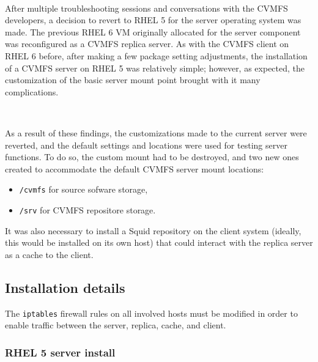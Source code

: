 \documentclass{article}
\begin{document}
~

After multiple troubleshooting sessions and conversations with the CVMFS developers, 
a decision to revert to RHEL 5 for the server operating system was made.  
The previous RHEL 6 VM originally allocated for the server component was reconfigured as a CVMFS replica server.  
As with the CVMFS client on RHEL 6 before, after making a few package setting adjustments, 
the installation of a CVMFS server on RHEL 5 was relatively simple; 
however, as expected, the customization of the basic server mount point brought with it many complications.  

~

As a result of these findings, 
the customizations made to the current server were reverted, 
and the default settings and locations were used for testing server functions.  
To do so, the custom mount had to be destroyed, 
and two new ones created to accommodate the default CVMFS server mount locations:

\begin{itemize}
    \item \verb+/cvmfs+ for source sofware storage,
    \item \verb+/srv+ for CVMFS repositore storage.
\end{itemize}

It was also necessary to install a Squid repository on the client system 
(ideally, this would be installed on its own host) 
that could interact with the replica server as a cache to the client.

\subsection{Installation details}

The \verb+iptables+ firewall rules on all involved hosts must be
modified in order to enable traffic between the server, replica, cache, and client.  

\subsubsection{RHEL 5 server install}
\end{document}
